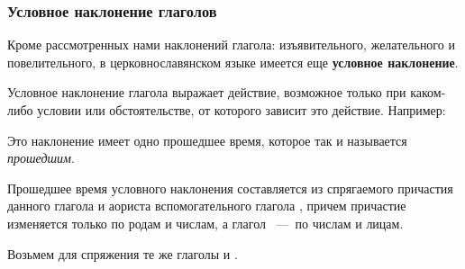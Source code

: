 \documentclass[11pt,a4paper,oneside]{memoir}
\begin{document}
                \subsubsection{Условное наклонение глаголов}

    Кроме рассмотренных нами наклонений глагола: изъявительного, желательного и повелительного, в церковнославянском языке имеется еще \textbf{условное наклонение}.
    
    Условное наклонение глагола выражает действие, возможное только при каком-либо условии или обстоятельстве, от которого зависит это действие. Например:
    
    \bigskip{}
    
    Это наклонение имеет одно прошедшее время, которое так и называется \emph{прошедшим}.
    
    Прошедшее время условного наклонения составляется из спрягаемого причастия данного глагола и аориста вспомогательного глагола {}, причем причастие изменяется только по родам и числам, а глагол {}~---~по числам и лицам.
    
    Возьмем для спряжения те же глаголы {} и {}.
    
\end{document}
